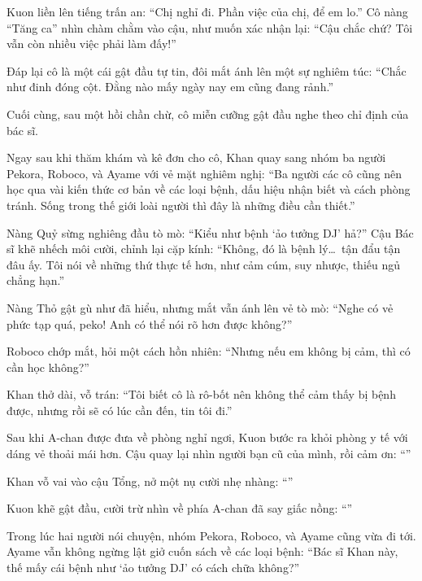 \documentclass[../main.tex]{subfiles}
\begin{document}
Kuon liền lên tiếng trấn an: ``Chị nghỉ đi. Phần việc của chị, để em lo.'' Cô nàng ``Tăng ca'' nhìn chàm chằm vào cậu, như muốn xác nhận lại: ``Cậu chắc chứ? Tôi vẫn còn nhiều việc phải làm đấy!''

Đáp lại cô là một cái gật đầu tự tin, đôi mắt ánh lên một sự nghiêm túc: ``Chắc như đinh đóng cột. Đằng nào mấy ngày nay em cũng đang rảnh.''

Cuối cùng, sau một hồi chần chừ, cô miễn cưỡng gật đầu nghe theo chỉ định của bác sĩ.

Ngay sau khi thăm khám và kê đơn cho cô, Khan quay sang nhóm ba người Pekora, Roboco, và Ayame với vẻ mặt nghiêm nghị: ``Ba người các cô cũng nên học qua vài kiến thức cơ bản về các loại bệnh, dấu hiệu nhận biết và cách phòng tránh. Sống trong thế giới loài người thì đây là những điều cần thiết.''

Nàng Quỷ sừng nghiêng đầu tò mò: ``Kiểu như bệnh `ảo tưởng DJ' hả?'' Cậu Bác sĩ khẽ nhếch môi cười, chỉnh lại cặp kính: ``Không, đó là bệnh lý\dots\ tận đẩu tận đâu ấy. Tôi nói về những thứ thực tế hơn, như cảm cúm, suy nhược, thiếu ngủ chẳng hạn.''

Nàng Thỏ gật gù như đã hiểu, nhưng mắt vẫn ánh lên vẻ tò mò: ``Nghe có vẻ phức tạp quá, peko! Anh có thể nói rõ hơn được không?''

Roboco chớp mắt, hỏi một cách hồn nhiên: ``Nhưng nếu em không bị cảm, thì có cần học không?''

Khan thở dài, vỗ trán: ``Tôi biết cô là rô-bốt nên không thể cảm thấy bị bệnh được, nhưng rồi sẽ có lúc cần đến, tin tôi đi.''

\ct

Sau khi A-chan được đưa về phòng nghỉ ngơi, Kuon bước ra khỏi phòng y tế với dáng vẻ thoải mái hơn. Cậu quay lại nhìn người bạn cũ của mình, rồi cảm ơn: ``''

Khan vỗ vai vào cậu Tổng, nở một nụ cười nhẹ nhàng: ``''

Kuon khẽ gật đầu, cười trừ nhìn về phía A-chan đã say giấc nồng: ``''

Trong lúc hai người nói chuyện, nhóm Pekora, Roboco, và Ayame cũng vừa đi tới. Ayame vẫn không ngừng lật giở cuốn sách về các loại bệnh: ``Bác sĩ Khan này, thế mấy cái bệnh như `ảo tưởng DJ' có cách chữa không?''
\end{document}
